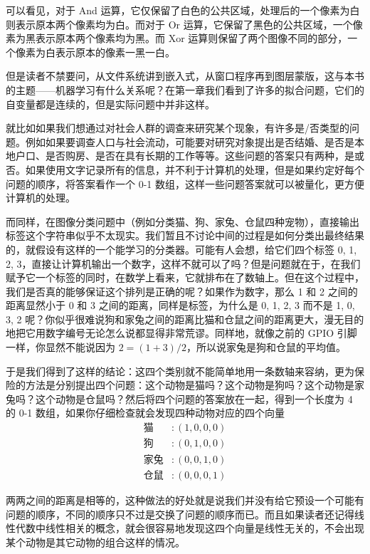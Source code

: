 可以看见，对于 And 运算，它仅保留了白色的公共区域，处理后的一个像素为白则表示原本两个像素均为白。而对于 Or 运算，它保留了黑色的公共区域，一个像素为黑表示原本两个像素均为黑。而 Xor 运算则保留了两个图像不同的部分，一个像素为白表示原本的像素一黑一白。

但是读者不禁要问，从文件系统讲到嵌入式，从窗口程序再到图层蒙版，这与本书的主题——机器学习有什么关系呢？在第一章我们看到了许多的拟合问题，它们的自变量都是连续的，但是实际问题中并非这样。

就比如如果我们想通过对社会人群的调查来研究某个现象，有许多是/否类型的问题。例如如果要调查人口与社会流动，可能要对研究对象提出是否结婚、是否是本地户口、是否购房、是否在具有长期的工作等等。这些问题的答案只有两种，是或否。如果使用文字记录所有的信息，并不利于计算机的处理，但是如果约定好每个问题的顺序，将答案看作一个 0-1 数组，这样一些问题答案就可以被量化，更方便计算机的处理。

而同样，在图像分类问题中（例如分类猫、狗、家兔、仓鼠四种宠物），直接输出标签这个字符串似乎不太现实。我们暂且不讨论中间的过程是如何分类出最终结果的，就假设有这样的一个能学习的分类器。可能有人会想，给它们四个标签 0, 1, 2, 3，直接让计算机输出一个数字，这样不就可以了吗？但是问题就在于，在我们赋予它一个标签的同时，在数学上看来，它就排布在了数轴上。但在这个过程中，我们是否真的能够保证这个排列是正确的呢？如果作为数字，那么 1 和 2 之间的距离显然小于 0 和 3 之间的距离，同样是标签，为什么是 0, 1, 2, 3 而不是 1, 0, 3, 2 呢？你似乎很难说狗和家兔之间的距离比猫和仓鼠之间的距离更大，漫无目的地把它用数字编号无论怎么说都显得非常荒谬。同样地，就像之前的 GPIO 引脚一样，你显然不能说因为 $2 = (1 + 3) / 2$，所以说家兔是狗和仓鼠的平均值。

于是我们得到了这样的结论：这四个类别就不能简单地用一条数轴来容纳，更为保险的方法是分别提出四个问题：这个动物是猫吗？这个动物是狗吗？这个动物是家兔吗？这个动物是仓鼠吗？然后将四个问题的答案放在一起，得到一个长度为 4 的 0-1 数组，如果你仔细检查就会发现四种动物对应的四个向量
\begin{align*}
    \text{猫}  & : (1, 0, 0, 0) \\
    \text{狗}  & : (0, 1, 0, 0) \\
    \text{家兔} & : (0, 0, 1, 0) \\
    \text{仓鼠} & : (0, 0, 0, 1)
\end{align*}

两两之间的距离是相等的，这种做法的好处就是说我们并没有给它预设一个可能有问题的顺序，不同的顺序只不过是交换了问题的顺序而已。而且如果读者还记得线性代数中线性相关的概念，就会很容易地发现这四个向量是线性无关的，不会出现某个动物是其它动物的组合这样的情况。


